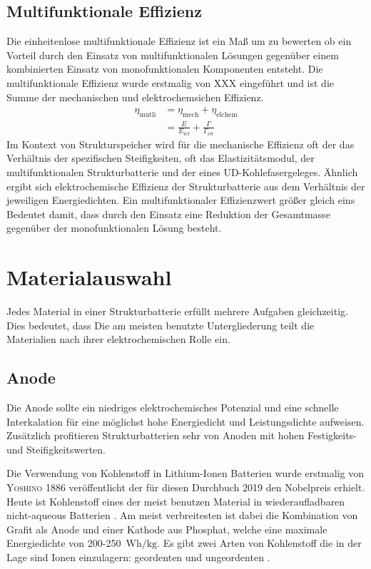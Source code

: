\subsection{Multifunktionale Effizienz}

Die einheitenlose multifunktionale Effizienz ist ein Maß um zu bewerten ob ein Vorteil durch den Einsatz von multifunktionalen Lösungen gegenüber einem kombinierten Einsatz von monofunktionalen Komponenten entsteht.
Die multifunktionale Effizienz wurde erstmalig von XXX eingeführt und ist die Summe der mechanischen  und elektrochemsichen Effizienz.
\begin{align}
	\eta_{\text{mutli}} &= \eta_{\text{mech}} + \eta_{\text{elchem}}\\
						&= \frac{E}{E_{\text{ref}}} + \frac{\Gamma}{\Gamma_\text{ref}} 
\end{align}
Im Kontext von Strukturspeicher wird für die mechanische Effizienz oft der das Verhältnis der spezifischen Steifigkeiten, oft das Elastizitätsmodul, der multifunktionalen Strukturbatterie und der eines UD-Kohlefasergeleges. Ähnlich ergibt sich elektrochemische Effizienz der Strukturbatterie aus dem Verhältnis der jeweiligen Energiedichten. Ein multifunktionaler Effizienzwert größer gleich eins Bedeutet damit, dass durch den Einsatz eine Reduktion der Gesamtmasse gegenüber der monofunktionalen Lösung besteht.

\section{Materialauswahl}

Jedes  Material in einer Strukturbatterie erfüllt mehrere Aufgaben gleichzeitig. Dies bedeutet, dass 
Die am meisten benutzte Untergliederung teilt die Materialien nach ihrer elektrochemischen Rolle ein.


\subsection{Anode}
Die Anode sollte ein niedriges elektrochemisches Potenzial und eine schnelle Interkalation für eine möglichst hohe Energiedicht und Leistungsdichte aufweisen. Zusätzlich profitieren Strukturbatterien sehr von Anoden mit hohen Festigkeits- und Steifigkeitswerten.

Die Verwendung von Kohlenstoff in Lithium-Ionen Batterien wurde erstmalig von \textsc{Yoshino} \cite{Yoshino1986} 1886 veröffentlicht der für diesen Durchbuch 2019 den Nobelpreis erhielt.
Heute ist Kohlenstoff eines der meist benutzen Material in wiederaufladbaren nicht-aqueous Batterien \cite{Ahmad2021}. Am meist verbreitesten ist dabei die Kombination von Grafit als Anode und einer Kathode aus Phosphat, welche eine maximale Energiedichte von 200-250~$\si{\watt \hour \per \kg}$. 
Es gibt zwei Arten von Kohlenstoff die in der Lage sind Ionen einzulagern: geordenten und ungeordenten \cite{Ghosh2024}.

